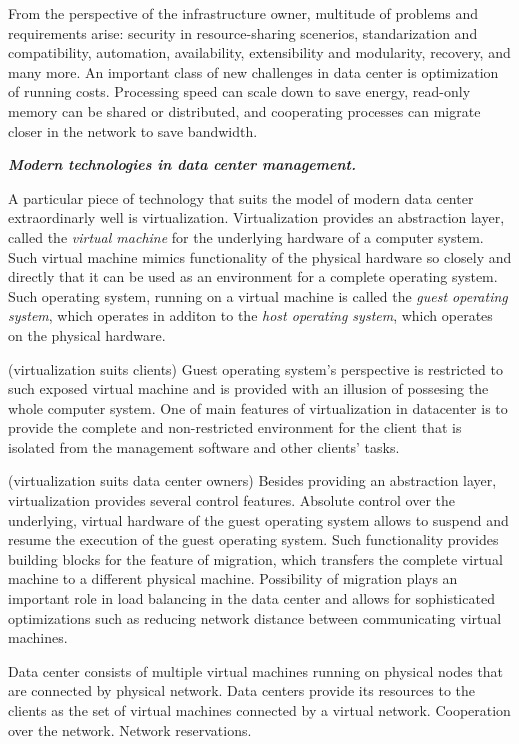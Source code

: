 From the perspective of the infrastructure owner, multitude of problems and requirements arise: security in resource-sharing scenerios, standarization and compatibility, automation, availability, extensibility and modularity, recovery, and many more.
An important class of new challenges in data center is optimization of running costs.
Processing speed can scale down to save energy, read-only memory can be shared or distributed, and cooperating processes can migrate closer in the network to save bandwidth.


\textbf{\emph{Modern technologies in data center management.}}

A particular piece of technology that suits the model of modern data center extraordinarly well is virtualization.
Virtualization provides an abstraction layer, called the \emph{virtual machine} for the underlying hardware of a computer system.
Such virtual machine mimics functionality of the physical hardware so closely and directly that it can be used as an environment for a complete operating system.
Such operating system, running on a virtual machine is called the \emph{guest operating system}, which operates in additon to the \emph{host operating system}, which operates on the physical hardware.

(virtualization suits clients)
Guest operating system's perspective is restricted to such exposed virtual machine and is provided with an illusion of possesing the whole computer system.
One of main features of virtualization in datacenter is to provide the complete and non-restricted environment for the client that is isolated from the management software and other clients' tasks.

(virtualization suits data center owners)
Besides providing an abstraction layer, virtualization provides several control features.
Absolute control over the underlying, virtual hardware of the guest operating system allows to suspend and resume the execution of the guest operating system.
Such functionality provides building blocks for the feature of migration, which transfers the complete virtual machine to a different physical machine.
Possibility of migration plays an important role in load balancing in the data center and allows for sophisticated optimizations such as reducing network distance between communicating virtual machines.

Data center consists of multiple virtual machines running on physical nodes that are connected by physical network.
Data centers provide its resources to the clients as the set of virtual machines connected by a virtual network.
Cooperation over the network. Network reservations.

